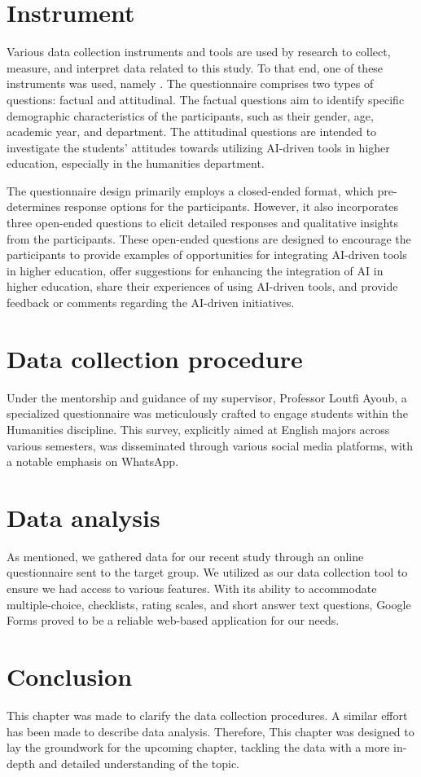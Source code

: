 \section{Instrument}
\justifying

Various data collection instruments and tools are used by research to collect,
measure, and interpret data related to this study. To that end, one of these
instruments was used, namely . The questionnaire comprises
two types of questions: factual and attitudinal. The factual questions aim to
identify specific demographic characteristics of the participants, such as
their gender, age, academic year, and department. The attitudinal questions
are intended to investigate the students’ attitudes towards utilizing AI-driven
tools in higher education, especially in the humanities department.


The questionnaire design primarily employs a closed-ended format,
which pre-determines response options for the participants. However,
it also incorporates three open-ended questions to elicit detailed
responses and qualitative insights from the participants. These
open-ended questions are designed to encourage the participants
to provide examples of opportunities for integrating AI-driven
tools in higher education, offer suggestions for enhancing the integration
of AI in higher education, share their experiences of using AI-driven tools,
and provide feedback or comments regarding the AI-driven initiatives.
\section{Data collection procedure}
Under the mentorship and guidance of my supervisor, Professor Loutfi Ayoub,
a specialized questionnaire was meticulously crafted to engage students within
the Humanities discipline. This survey, explicitly aimed at English majors across
various semesters, was disseminated through various social media platforms,
with a notable emphasis on WhatsApp.
\section{Data analysis}
As mentioned, we gathered data for our recent study through an online
questionnaire sent to the target group. We utilized  as 
our data collection tool to ensure we had access to various features.
With its ability to accommodate multiple-choice, checklists, rating
scales, and short answer text questions, Google Forms proved to
be a reliable web-based application for our needs.
\section{Conclusion}
This chapter was made to clarify the data collection procedures.
A similar effort has been made to describe data analysis.
Therefore, This chapter was designed to lay the groundwork
for the upcoming chapter, tackling the data with a
more in-depth and detailed understanding of the topic.
